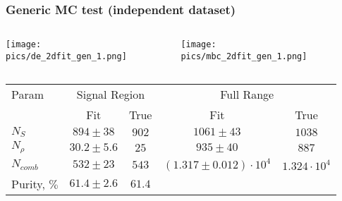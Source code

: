 \documentclass[10 pt,compress,mathserif]{beamer}
\begin{document}
\begin{frame}
 \frametitle{Generic MC test (independent dataset)}
 \begin{columns}
  \begin{column}{0.33\textwidth}
   \begin{center}
    \texttt{[image: pics/de\_2dfit\_gen\_1.png]}
   \end{center}
  \end{column}
  \begin{column}{0.33\textwidth}
   \begin{center}
    \texttt{[image: pics/mbc\_2dfit\_gen\_1.png]}
   \end{center}
  \end{column}
  \begin{column}{0.34\textwidth}
   \begin{center}
   \end{center}
  \end{column}
 \end{columns}
 
\begin{table}[bt]
 \small
 \begin{tabular}{|l|c|c|c|c|} \hline
Param & \multicolumn{2}{c|}{Signal Region}& \multicolumn{2}{c|}{Full Range}\\ \hhline{~----}
             &      Fit     & True  &      Fit      & True   \\ \hline
  $N_S$      & $894 \pm 38$ & $902$ & $1061 \pm 43$ & $1038$ \\ \hline
  $N_{\rho}$ & $30.2\pm 5.6$& $25$  & $935  \pm 40$ & $887$  \\ \hline
  $N_{comb}$ & $532 \pm 23$ & $543$ & $(1.317\pm 0.012)\cdot 10^4$ & $1.324\cdot 10^4$ \\ \hline
Purity, $\%$ &$61.4 \pm 2.6$& $61.4$ &  &  \\ \hline
 \end{tabular}
 \end{table}
 


\end{frame}
\end{document}
